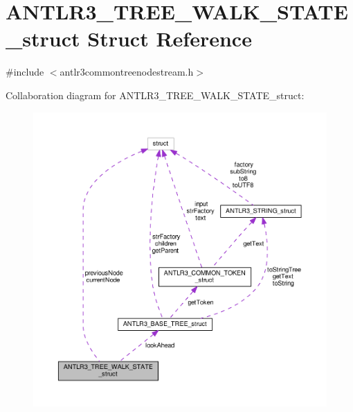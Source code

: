 \hypertarget{struct_a_n_t_l_r3___t_r_e_e___w_a_l_k___s_t_a_t_e__struct}{\section{A\-N\-T\-L\-R3\-\_\-\-T\-R\-E\-E\-\_\-\-W\-A\-L\-K\-\_\-\-S\-T\-A\-T\-E\-\_\-struct Struct Reference}
\label{struct_a_n_t_l_r3___t_r_e_e___w_a_l_k___s_t_a_t_e__struct}
}


{\ttfamily \#include $<$antlr3commontreenodestream.\-h$>$}



Collaboration diagram for A\-N\-T\-L\-R3\-\_\-\-T\-R\-E\-E\-\_\-\-W\-A\-L\-K\-\_\-\-S\-T\-A\-T\-E\-\_\-struct\-:
\nopagebreak
\begin{figure}[H]
\begin{center}
\leavevmode
\includegraphics[width=350pt]{struct_a_n_t_l_r3___t_r_e_e___w_a_l_k___s_t_a_t_e__struct__coll__graph}
\end{center}
\end{figure}
